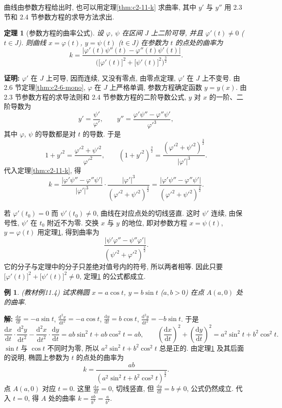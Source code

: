 \documentclass[UTF8,openany]{ctexbook}
\theoremstyle{chinesetextbook}
\newtheorem{example}{例}[section]
\newtheorem{theorem}{定理}[section]
\newenvironment{cnproof}{\par\indent\textbf{证明:} \ignorespaces}{\par}
\newenvironment{cnsolution}{\par\indent\textbf{解:} \ignorespaces}{\par}
\newcommand{\dd}{\mathrm d}
\begin{document}
曲线由参数方程给出时, 也可以用定理\ref{thm:c2-11-k} 求曲率, 其中 $y'$ 与 $y''$ 用 2.3 节和 2.4 节参数方程的求导方法求出.
\begin{theorem}[参数方程的曲率公式]\label{thm:c2-11-param}
设 $\varphi$, $\psi$ 在区间 $J$ 上二阶可导, 并且 $\varphi'(t)\ne0$ ($t\in J$). 则曲线 $x=\varphi(t)$, $y=\psi(t)$ ($t\in J$) 在参数为 $t$ 的点处的曲率为
\[
k=\frac{|\varphi'(t)\psi''(t)-\varphi''(t)\psi'(t)|}{\bigl(\bigl[\varphi'(t)\bigr]^2+\bigl[\psi'(t)\bigr]^2\bigr)^{\frac32}}.
\]
\end{theorem}
\begin{cnproof}
$\varphi'$ 在 $J$ 上可导, 因而连续, 又没有零点, 由零点定理, $\varphi'$ 在 $J$ 上不变号. 由 2.6 节定理\ref{thm:c2-6-mono}, $\varphi$ 在 $J$ 上严格单调, 参数方程确定函数 $y=y(x)$. 由 2.3 节参数方程的求导法则和 2.4 节参数方程的二阶导数公式, $y$ 对 $x$ 的一阶、二阶导数为
\[
y'=\frac{\psi'}{\varphi'},\qquad y''=\frac{\varphi'\psi''-\varphi''\psi'}{\varphi'^3},
\]
其中 $\varphi$, $\psi$ 的导数都是对 $t$ 的导数. 于是
\[
1+y'^2=\frac{\varphi'^2+\psi'^2}{\varphi'^2},\qquad(1+y'^2)^{\frac32}=\frac{(\varphi'^2+\psi'^2)^{\frac32}}{|\varphi'|^3}.
\]
代入定理\ref{thm:c2-11-k}, 得
\[
k=\frac{|\varphi'\psi''-\varphi''\psi'|}{|\varphi'|^3}\cdot\frac{|\varphi'|^3}{(\varphi'^2+\psi'^2)^{\frac32}}=\frac{|\varphi'\psi''-\varphi''\psi'|}{(\varphi'^2+\psi'^2)^{\frac32}}.
\]
\end{cnproof}
若 $\varphi'(t_0)=0$ 而 $\psi'(t_0)\ne0$, 曲线在对应点处的切线竖直. 这时 $\psi'$ 连续, 由保号性, $\psi'$ 在 $t_0$ 附近不为零. 交换 $x$ 与 $y$ 的地位, 即对参数方程 $x=\psi(t)$, $y=\varphi(t)$ 用定理\ref{thm:c2-11-param}, 得到曲率为
\[
\frac{|\psi'\varphi''-\psi''\varphi'|}{(\psi'^2+\varphi'^2)^{\frac32}}.
\]
它的分子与定理中的分子只差绝对值号内的符号, 所以两者相等. 因此只要 $\bigl[\varphi'(t)\bigr]^2+\bigl[\psi'(t)\bigr]^2\ne0$, 定理\ref{thm:c2-11-param} 的公式都成立.
\begin{example}\label{ex:c2-11-4}
\textnormal{(教材例11.4)} 试求椭圆 $x=a\cos t$, $y=b\sin t$ ($a,b>0$) 在点 $A(a,0)$ 处的曲率.
\end{example}
\begin{cnsolution}
$\displaystyle\frac{\dd x}{\dd t}=-a\sin t$, $\displaystyle\frac{\dd^2x}{\dd t^2}=-a\cos t$, $\displaystyle\frac{\dd y}{\dd t}=b\cos t$, $\displaystyle\frac{\dd^2y}{\dd t^2}=-b\sin t$. 于是
\[
\frac{\dd x}{\dd t}\cdot\frac{\dd^2y}{\dd t^2}-\frac{\dd^2x}{\dd t^2}\cdot\frac{\dd y}{\dd t}=ab\sin^2t+ab\cos^2t=ab,\qquad\left(\frac{\dd x}{\dd t}\right)^2+\left(\frac{\dd y}{\dd t}\right)^2=a^2\sin^2t+b^2\cos^2t.
\]
$\sin t$ 与 $\cos t$ 不同时为零, 所以 $a^2\sin^2t+b^2\cos^2t$ 总是正的. 由定理\ref{thm:c2-11-param} 及其后面的说明, 椭圆上参数为 $t$ 的点处的曲率为
\[
k=\frac{ab}{(a^2\sin^2t+b^2\cos^2t)^{\frac32}}.
\]
点 $A(a,0)$ 对应 $t=0$. 这里 $\displaystyle\frac{\dd x}{\dd t}=0$, 切线竖直, 但 $\displaystyle\frac{\dd y}{\dd t}=b\ne0$, 公式仍然成立. 代入 $t=0$, 得 $A$ 处的曲率 $\displaystyle k=\frac{ab}{b^3}=\frac a{b^2}$.
\end{cnsolution}
\end{document}
